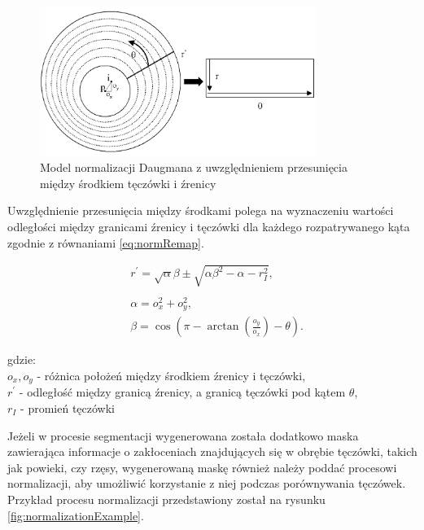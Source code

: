 \documentclass[10pt,polish,a4paper,oneside]{ppfcmthesis}
\begin{document}
\begin{figure}[ht]
  \includegraphics[width=0.8\textwidth]{images/normalization/schemaOffCenter.png}
  \centering
  \caption{Model normalizacji Daugmana z uwzględnieniem przesunięcia między środkiem tęczówki i \'zrenicy \cite{aliasingIris}}
  \label{fig:daugmanDiagramOffCenter}
\end{figure}

Uwzględnienie przesunięcia między środkami polega na wyznaczeniu wartości odległości między granicami
\'zrenicy i tęczówki dla każdego rozpatrywanego kąta \cite{masek} zgodnie z równaniami \ref{eq:normRemap}.

\begin{equation}
  \begin{aligned}
    &r^{\prime} = \sqrt{\alpha}\beta \pm \sqrt{\alpha\beta^{2} - \alpha - r_{I}^{2}},
    \\
    \\
    &\alpha = o_{x}^{2} + o_{y}^{2},
    \\
    &\beta = \cos \left( \pi - \arctan \left( \frac{o_{y}}{o_{x}} \right) - \theta \right).
  \end{aligned}
  \label{eq:normRemap}
\end{equation}

\noindent
gdzie:\\
\indent $o_{x}, o_{y}$ - różnica położeń między środkiem \'zrenicy i tęczówki,\\
\indent $r^{\prime}$ - odległoś\'c między granicą \'zrenicy, a granicą tęczówki pod kątem $\theta$,\\
\indent $r_{I}$ - promień tęczówki\newline

Jeżeli w procesie segmentacji wygenerowana została dodatkowo maska zawierająca informacje o
zakłoceniach znajdujących się w obrębie tęczówki, takich jak powieki, czy rzęsy, wygenerowaną
maskę również należy podda\'c procesowi normalizacji, aby umożliwi\'c korzystanie z niej podczas
porównywania tęczówek. Przykład procesu normalizacji przedstawiony został na rysunku \ref{fig:normalizationExample}.
\end{document}
